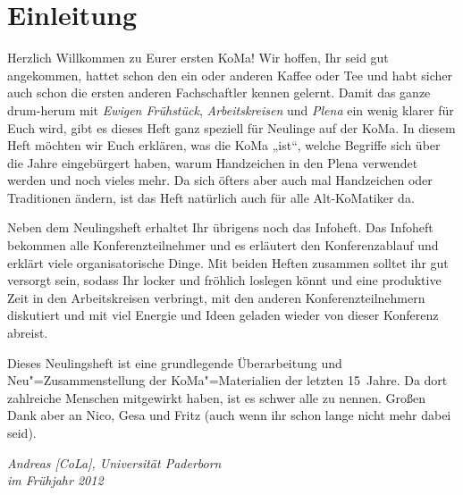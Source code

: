 \chapter{Einleitung}

Herzlich Willkommen zu Eurer ersten KoMa! Wir hoffen, Ihr seid gut angekommen,
hattet schon den ein oder anderen Kaffee oder Tee und habt sicher auch schon
die ersten anderen Fachschaftler kennen gelernt. Damit das ganze drum-herum mit
\emph{Ewigen Frühstück}, \emph{Arbeitskreisen} und \emph{Plena} ein wenig
klarer für Euch wird, gibt es dieses Heft ganz speziell für Neulinge auf der
KoMa. In diesem Heft möchten wir Euch erklären, was die KoMa „ist“, welche
Begriffe sich über die Jahre eingebürgert haben, warum Handzeichen in den Plena
verwendet werden und noch vieles mehr. Da sich öfters aber auch mal Handzeichen
oder Traditionen ändern, ist das Heft natürlich auch für alle Alt-KoMatiker da.

Neben dem Neulingsheft erhaltet Ihr übrigens noch das Infoheft. Das Infoheft
bekommen alle Konferenzteilnehmer und es erläutert den Konferenzablauf und
erklärt viele organisatorische Dinge. Mit beiden Heften zusammen solltet ihr
gut versorgt sein, sodass Ihr locker und fröhlich loslegen könnt und eine
produktive Zeit in den Arbeitskreisen verbringt, mit den anderen
Konferenzteilnehmern diskutiert und mit viel Energie und Ideen geladen wieder
von dieser Konferenz abreist.

Dieses Neulingsheft ist eine grundlegende Überarbeitung und
Neu"=Zusammenstellung der KoMa"=Materialien der letzten 15~Jahre. %
Da dort zahlreiche Menschen mitgewirkt haben, ist es schwer alle zu nennen.
Großen Dank aber an Nico, Gesa und Fritz (auch wenn ihr schon lange nicht mehr
dabei seid).

\bigskip

\emph{Andreas [CoLa], Universität Paderborn} \\
\emph{im Frühjahr 2012}
